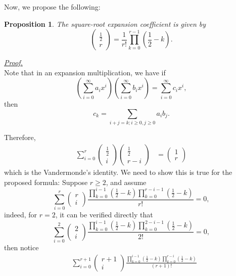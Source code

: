 \documentclass[12pt]{article}
\newtheorem*{proposition}{Proposition}
\renewenvironment{proof}[1][Proof]{\begin{snugshade*} \underline{\textit{{#1}.}}\\}{\hfill \qedsymbol \end{snugshade*}}
\begin{document}
    Now, we propose the following:

    \begin{proposition}
        The square-root expansion coefficient is given by \[\begin{pmatrix}
            \frac{1}{2}\\r
        \end{pmatrix}=\frac{1}{r!}\prod_{k=0}^{r-1}(\frac{1}{2}-k).\] 
    \end{proposition}

    \begin{proof}
        Note that in an expansion multiplication, we have if \[(\sum_{i=0}^{\infty}a_i x^i)(\sum_{i=0}^{\infty}b_i x^i)=\sum_{i=0}^{\infty}c_i x^i,\] then \[c_k=\sum_{i+j=k;i\geq 0,j\geq 0}a_i b_j.\]

        Therefore, \begin{align*}
            \sum_{i=0}^r\begin{pmatrix}
                \frac{1}{2}\\i
            \end{pmatrix}\begin{pmatrix}
                \frac{1}{2}\\r-i
            \end{pmatrix}&=\begin{pmatrix}
                1\\r
            \end{pmatrix}
        \end{align*}
        which is the Vandermonde's identity. We need to show this is true for the proposed formula: Suppose $r\geq 2$, and assume \[\sum_{i=0}^{r}\begin{pmatrix}
            r\\i
        \end{pmatrix}\frac{\prod_{k=0}^{i-1}(\frac{1}{2}-k)\prod_{k=0}^{r-i-1}(\frac{1}{2}-k)}{r!}=0,\] indeed, for $r=2$, it can be verified directly that \[\sum_{i=0}^{2}\begin{pmatrix}
            2\\i
        \end{pmatrix}\frac{\prod_{k=0}^{i-1}(\frac{1}{2}-k)\prod_{k=0}^{2-i-1}(\frac{1}{2}-k)}{2!}=0,\] then notice \begin{align*}
            &\sum_{i=0}^{r+1}\begin{pmatrix}
                r+1\\i
            \end{pmatrix}\frac{\prod_{k=0}^{i-1}(\frac{1}{2}-k)\prod_{k=0}^{r-i}(\frac{1}{2}-k)}{(r+1)!}\\

\end{align*}
\end{proof}
\end{document}
